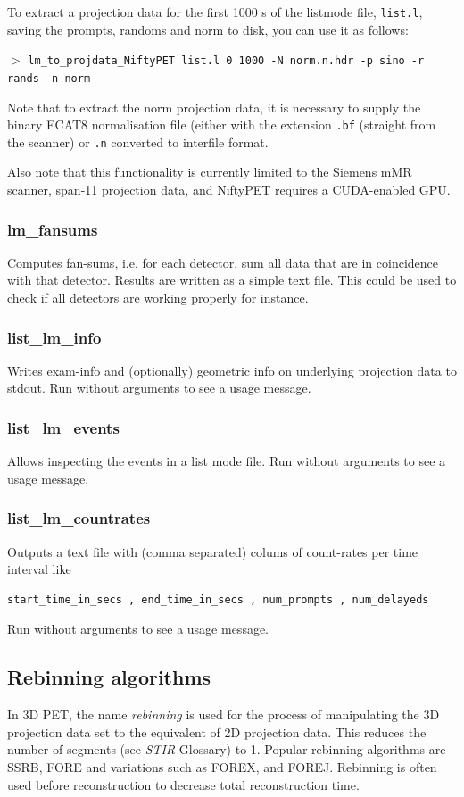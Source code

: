 \documentclass{article}
\newcommand{\cmdline}[1]{\par \noindent $>$ \texttt{#1}\par}
\begin{document}
To extract a projection data for the first 1000 s of the listmode file, \texttt{list.l}, saving the prompts, randoms and norm to disk, you can use it as follows:

\cmdline{lm\_to\_projdata\_NiftyPET list.l 0 1000 -N norm.n.hdr -p sino -r rands -n norm}

Note that to extract the norm projection data, it is necessary to supply the binary ECAT8 normalisation file (either with the extension \texttt{.bf} (straight from the scanner) or \texttt{.n} converted to interfile format.

Also note that this functionality is currently limited to the Siemens mMR scanner, span-11 projection data, and NiftyPET requires a CUDA-enabled GPU.

\subsubsection{
lm\_fansums}
Computes fan-sums, i.e. for each detector, sum all data that are in coincidence with that detector.
Results are written as a simple text file. This could be used to check if all detectors are working
properly for instance.

\subsubsection{
list\_lm\_info}
Writes exam-info and (optionally) geometric info on underlying projection data to stdout.
Run without arguments to see a usage message.

\subsubsection{
list\_lm\_events}
Allows inspecting the events in a list mode file. Run without arguments to see a usage message.

\subsubsection{
list\_lm\_countrates}
Outputs a text file with (comma separated) colums of count-rates per
time interval like
\begin{verbatim}
start_time_in_secs , end_time_in_secs , num_prompts , num_delayeds
\end{verbatim}
Run without arguments to see a usage message.

\subsection{
Rebinning algorithms}
\label{sec:Rebinning}
In 3D PET, the name \textit{rebinning} is used for the 
process of manipulating the 3D projection data set to the equivalent 
of 2D projection data. This reduces the number of segments (see 
\textit{STIR} Glossary) to 1. Popular rebinning algorithms are SSRB, FORE 
and variations such as FOREX, and FOREJ. Rebinning is often used 
before reconstruction to decrease total reconstruction time.
\end{document}
